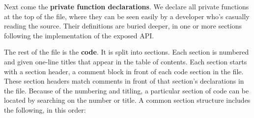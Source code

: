 

Next come the {\bfseries private function declarations}.  We declare
all private functions at the top of the file, where they can be seen
easily by a developer who's casually reading the source. Their
definitions are buried deeper, in one or more sections following the
implementation of the exposed API.



The rest of the file is the {\bfseries code}. It is split into
sections. Each section is numbered and given one-line titles that
appear in the table of contents.  Each section starts with a section
header, a comment block in front of each code section in the
 file.  These section headers match comments in front of
that section's declarations in the  file. Because of the
numbering and titling, a particular section of code can be located by
searching on the number or title.  A common section structure includes
the following, in this order:



